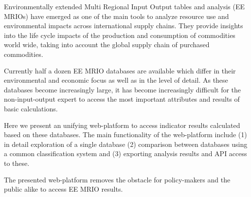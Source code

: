 Environmentally extended Multi Regional Input Output tables and analysis (EE MRIOs) have emerged as one of the main tools to analyze resource use and environmental impacts across international supply chains. They provide insights into the life cycle impacts of the production and consumption of commodities world wide, taking into account the global supply chain of purchased commodities.

Currently half a dozen EE MRIO databases are available which differ in their environmental and economic focus as well as in the level of detail. As these databases become increasingly large, it has become increasingly difficult for the non-input-output expert to access the most important attributes and results of basic calculations.

Here we present an unifying web-platform to access indicator results calculated based on these databases. The main functionality of the web-platform include (1) in detail exploration of a single database (2) comparison between databases using a common classification system and (3) exporting analysis results and API access to these.

The presented web-platform removes the obstacle for policy-makers and the public alike to access EE MRIO results. 
